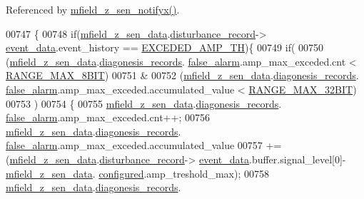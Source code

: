 Referenced by \hyperlink{a00053_source_l00114}{mfield\+\_\+z\+\_\+sen\+\_\+notifyx()}.


\begin{DoxyCode}
00747                                            \{
00748         \textcolor{keywordflow}{if}(\hyperlink{a00053_ae42bea09c571df9fad890518725d5cf4}{mfield\_z\_sen\_data}.\hyperlink{a00027_ac9b38e2c1d3f1013a88d33506c754152}{disturbance\_record}->
      \hyperlink{a00028_a8c0bda69e71ef674e60da47ad0be9ab0}{event\_data}.event\_history == \hyperlink{a00019_a9c5372190518a7d696da393f1a9a5fb9}{EXCEDED\_AMP\_TH})\{
00749                \textcolor{keywordflow}{if}(
00750                 (\hyperlink{a00053_ae42bea09c571df9fad890518725d5cf4}{mfield\_z\_sen\_data}.\hyperlink{a00027_a2bd79ce84bbd6b7f50d38954f7ae475e}{diagonesis\_records}.
      \hyperlink{a00019_a55109284fe950025b5d9f3dde60d4553}{false\_alarm}.amp\_max\_exceded.cnt < \hyperlink{a00021_ae0c75a1cb44e5d3f00ec7c9e40acfda8}{RANGE\_MAX\_8BIT})
00751                 &
00752                 (\hyperlink{a00053_ae42bea09c571df9fad890518725d5cf4}{mfield\_z\_sen\_data}.\hyperlink{a00027_a2bd79ce84bbd6b7f50d38954f7ae475e}{diagonesis\_records}.
      \hyperlink{a00019_a55109284fe950025b5d9f3dde60d4553}{false\_alarm}.amp\_max\_exceded.accumulated\_value < \hyperlink{a00021_a334bd006b6d2b397dbfc620d62c3c35c}{RANGE\_MAX\_32BIT})
00753                )
00754                \{
00755                      \hyperlink{a00053_ae42bea09c571df9fad890518725d5cf4}{mfield\_z\_sen\_data}.\hyperlink{a00027_a2bd79ce84bbd6b7f50d38954f7ae475e}{diagonesis\_records}.
      \hyperlink{a00019_a55109284fe950025b5d9f3dde60d4553}{false\_alarm}.amp\_max\_exceded.cnt++;
00756                      \hyperlink{a00053_ae42bea09c571df9fad890518725d5cf4}{mfield\_z\_sen\_data}.\hyperlink{a00027_a2bd79ce84bbd6b7f50d38954f7ae475e}{diagonesis\_records}.
      \hyperlink{a00019_a55109284fe950025b5d9f3dde60d4553}{false\_alarm}.amp\_max\_exceded.accumulated\_value
00757                      +=(\hyperlink{a00053_ae42bea09c571df9fad890518725d5cf4}{mfield\_z\_sen\_data}.\hyperlink{a00027_ac9b38e2c1d3f1013a88d33506c754152}{disturbance\_record}->
      \hyperlink{a00028_a8c0bda69e71ef674e60da47ad0be9ab0}{event\_data}.buffer.signal\_level[0]-\hyperlink{a00053_ae42bea09c571df9fad890518725d5cf4}{mfield\_z\_sen\_data}.
      \hyperlink{a00027_a94b2d1f6ea4ab334c74d24984dd27843}{configured}.amp\_treshold\_max);
00758                      \hyperlink{a00053_ae42bea09c571df9fad890518725d5cf4}{mfield\_z\_sen\_data}.\hyperlink{a00027_a2bd79ce84bbd6b7f50d38954f7ae475e}{diagonesis\_records}.

\end{DoxyCode}

